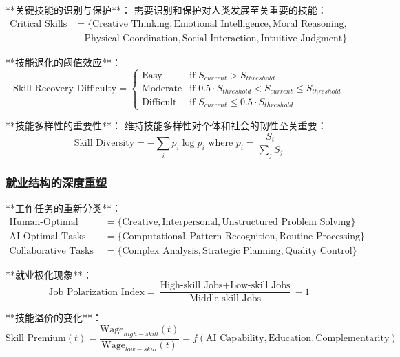 **关键技能的识别与保护**：
需要识别和保护对人类发展至关重要的技能：
\begin{align}
\text{Critical Skills} &= \{\text{Creative Thinking}, \text{Emotional Intelligence}, \text{Moral Reasoning}, \\
&\quad \text{Physical Coordination}, \text{Social Interaction}, \text{Intuitive Judgment}\}
\end{align}

**技能退化的阈值效应**：
\begin{equation}
\text{Skill Recovery Difficulty} = \begin{cases}
\text{Easy} & \text{if } S_{current} > S_{threshold} \\
\text{Moderate} & \text{if } 0.5 \cdot S_{threshold} < S_{current} \leq S_{threshold} \\
\text{Difficult} & \text{if } S_{current} \leq 0.5 \cdot S_{threshold}
\end{cases}
\end{equation}

**技能多样性的重要性**：
维持技能多样性对个体和社会的韧性至关重要：
\begin{equation}
\text{Skill Diversity} = -\sum_{i} p_i \log p_i \text{ where } p_i = \frac{S_i}{\sum_j S_j}
\end{equation}

\subsubsection{就业结构的深度重塑} %

**工作任务的重新分类**：
\begin{align}
\text{Human-Optimal Tasks} &= \{\text{Creative}, \text{Interpersonal}, \text{Unstructured Problem Solving}\} \\
\text{AI-Optimal Tasks} &= \{\text{Computational}, \text{Pattern Recognition}, \text{Routine Processing}\} \\
\text{Collaborative Tasks} &= \{\text{Complex Analysis}, \text{Strategic Planning}, \text{Quality Control}\}
\end{align}

**就业极化现象**：
\begin{equation}
\text{Job Polarization Index} = \frac{\text{High-skill Jobs} + \text{Low-skill Jobs}}{\text{Middle-skill Jobs}} - 1
\end{equation}

**技能溢价的变化**：
\begin{equation}
\text{Skill Premium}(t) = \frac{\text{Wage}_{high-skill}(t)}{\text{Wage}_{low-skill}(t)} = f(\text{AI Capability}, \text{Education}, \text{Complementarity})
\end{equation}

